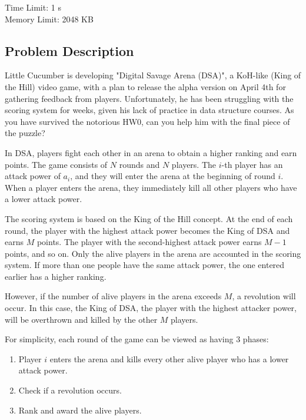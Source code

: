 \providecommand{\tightlist}{\setlength{\itemsep}{0pt}\setlength{\parskip}{0pt}}
\setcounter{secnumdepth}{0}

Time Limit: 1 s \\
Memory Limit: 2048 KB

\subsection{Problem Description}\label{problem-description}

Little Cucumber is developing "Digital Savage Arena (DSA)", a KoH-like (King of the Hill) video game, with a plan to release the alpha version on April 4th for gathering feedback from players. Unfortunately, he has been struggling with the scoring system for weeks, given his lack of practice in data structure courses. As you have survived the notorious HW0, can you help him with the final piece of the puzzle?

In DSA, players fight each other in an arena to obtain a higher ranking and earn points. The game consists of $N$ rounds and $N$ players. The $i$-th player has an attack power of $a_i$, and they will enter the arena at the beginning of round $i$. When a player enters the arena, they immediately kill all other players who have a lower attack power. 

The scoring system is based on the King of the Hill concept. At the end of each round, the player with the highest attack power becomes the King of DSA and earns $M$ points. The player with the second-highest attack power earns $M-1$ points, and so on. Only the alive players in the arena are accounted in the scoring system. If more than one people have the same attack power, the one entered earlier has a higher ranking. 

However, if the number of alive players in the arena exceeds $M$, a revolution will occur. In this case, the King of DSA, the player with the highest attacker power, will be overthrown and killed by the other $M$ players. 

For simplicity, each round of the game can be viewed as having 3 phases:
\begin{enumerate}
\tightlist
    \item Player $i$ enters the arena and kills every other alive player who has a lower attack power. 
    \item Check if a revolution occurs. 
    \item Rank and award the alive players. 
\end{enumerate}


